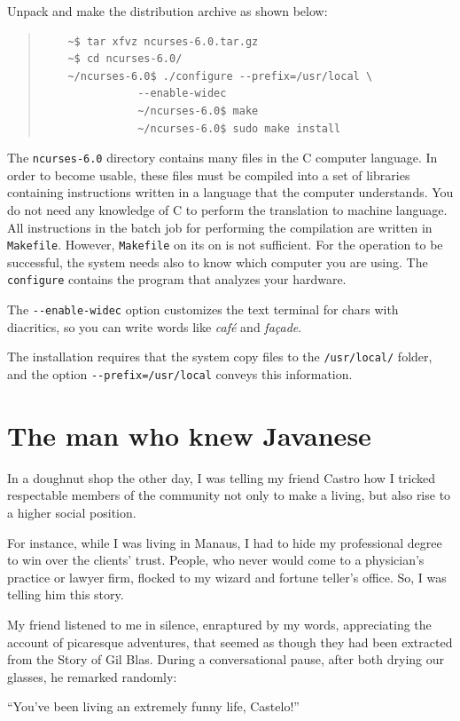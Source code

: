 \documentclass[a4paper,12pt]{book}
\begin{document}
Unpack and make the distribution archive as shown below:
\begin{quote}
	\begin{verbatim}
	~$ tar xfvz ncurses-6.0.tar.gz
	~$ cd ncurses-6.0/
	~/ncurses-6.0$ ./configure --prefix=/usr/local \
			   --enable-widec
			   ~/ncurses-6.0$ make
			   ~/ncurses-6.0$ sudo make install
	\end{verbatim}
\end{quote}
The \verb|ncurses-6.0| directory contains
many files in the C  computer language.
In order to become usable, these files
must be compiled into a set of libraries
containing instructions written in a
language that the computer understands.
You do not need any knowledge of C to
perform the translation to machine
language. All instructions in the
batch job for performing the compilation
are written in  \verb|Makefile|. However,
\verb|Makefile| on its on is not
sufficient. For the operation to be
successful, the system needs also to know which
computer you are using. The \verb|configure|
contains the program that analyzes your
hardware.

The \verb|--enable-widec| option customizes
the text terminal for chars with
diacritics, so you can write words
like {\em café} and {\em façade}.

The installation requires that the system copy files
to the \verb|/usr/local/| folder, and the option
\verb|--prefix=/usr/local| conveys this information.

\chapter{The man who knew Javanese}
In a doughnut shop the other day,
I was telling my friend Castro
how I tricked respectable members of the
community not only to make a living,
but also rise to a higher social position.

For instance, while I was living in Manaus,
I had to hide my professional degree to win
over the clients' trust. People, who never would
come to a physician's practice or lawyer firm,
flocked to my wizard and fortune teller's office.
So, I was telling him this story.

My friend listened to me in silence,
enraptured by my words,
appreciating the account of picaresque adventures,
that seemed as though they had been
extracted from the Story of Gil Blas.
During a conversational pause,
after both drying our glasses,
he remarked randomly:

``You've been living an extremely funny life, Castelo!''
\end{document}
